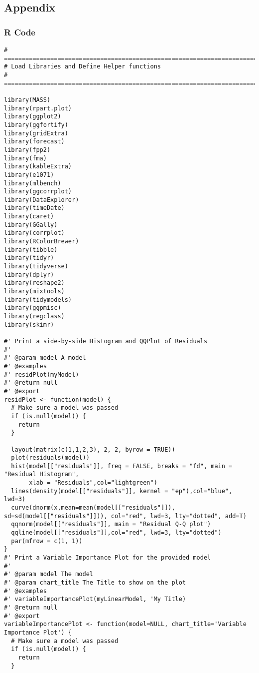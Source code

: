 \documentclass[
]{article}
\begin{document}
\hypertarget{appendix}{%
\subsection{Appendix}\label{appendix}}

\hypertarget{r-code}{%
\subsubsection{R Code}\label{r-code}}

\begin{verbatim}
# =====================================================================================
# Load Libraries and Define Helper functions 
# =====================================================================================

library(MASS)
library(rpart.plot)
library(ggplot2)
library(ggfortify)
library(gridExtra)
library(forecast)
library(fpp2)
library(fma)
library(kableExtra)
library(e1071)
library(mlbench)
library(ggcorrplot)
library(DataExplorer)
library(timeDate)
library(caret)
library(GGally)
library(corrplot)
library(RColorBrewer)
library(tibble)
library(tidyr)
library(tidyverse)
library(dplyr)
library(reshape2)
library(mixtools)
library(tidymodels)
library(ggpmisc)
library(regclass)
library(skimr)

#' Print a side-by-side Histogram and QQPlot of Residuals
#'
#' @param model A model
#' @examples
#' residPlot(myModel)
#' @return null
#' @export
residPlot <- function(model) {
  # Make sure a model was passed
  if (is.null(model)) {
    return
  }
  
  layout(matrix(c(1,1,2,3), 2, 2, byrow = TRUE))
  plot(residuals(model))
  hist(model[["residuals"]], freq = FALSE, breaks = "fd", main = "Residual Histogram",
       xlab = "Residuals",col="lightgreen")
  lines(density(model[["residuals"]], kernel = "ep"),col="blue", lwd=3)
  curve(dnorm(x,mean=mean(model[["residuals"]]), sd=sd(model[["residuals"]])), col="red", lwd=3, lty="dotted", add=T)
  qqnorm(model[["residuals"]], main = "Residual Q-Q plot")
  qqline(model[["residuals"]],col="red", lwd=3, lty="dotted")
  par(mfrow = c(1, 1))
}
#' Print a Variable Importance Plot for the provided model
#'
#' @param model The model
#' @param chart_title The Title to show on the plot
#' @examples
#' variableImportancePlot(myLinearModel, 'My Title)
#' @return null
#' @export
variableImportancePlot <- function(model=NULL, chart_title='Variable Importance Plot') {
  # Make sure a model was passed
  if (is.null(model)) {
    return
  }
  

\end{verbatim}
\end{document}
